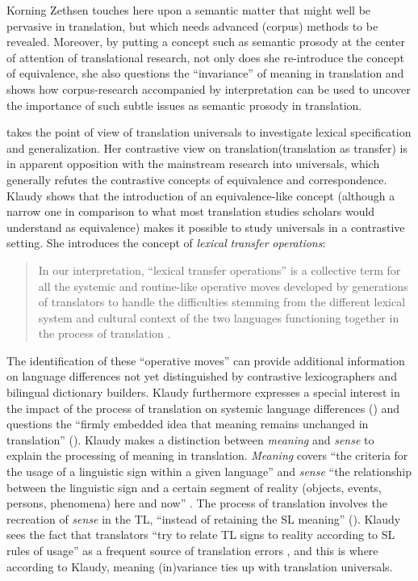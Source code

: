 Korning Zethsen touches here upon a semantic matter that might well be pervasive in translation, but which needs advanced (corpus) methods to be revealed. Moreover, by putting a concept such as semantic prosody at the center of attention of translational research, not only does she re-introduce the concept of equivalence, she also questions the ``invariance'' of meaning in translation and shows how corpus-research accompanied by interpretation can be used to uncover the importance of such subtle issues as semantic prosody in translation.

\citet{lewandowska-tomasczyk_specification_2010} takes the point of view of translation universals to investigate lexical specification and generalization. Her contrastive view on translation\linebreak (translation as transfer) is in apparent opposition with the mainstream research into universals, which generally refutes the contrastive concepts of equivalence and correspondence. Klaudy shows that the introduction of an equivalence-like concept (although a narrow one in comparison to what most translation studies scholars would understand as equivalence) makes it possible to study universals in a contrastive setting. She introduces the concept of \textit{lexical} \textit{transfer} \textit{operations}:

\begin{quote}
In our interpretation, “lexical transfer operations” is a collective term for all the systemic and routine-like operative moves developed by generations of translators to handle the difficulties stemming from the different lexical system and cultural context of the two languages functioning together in the process of translation \citep[81]{lewandowska-tomasczyk_specification_2010}.
\end{quote}

The identification of these “operative moves” can provide additional information on language differences not yet distinguished by contrastive lexicographers and bilingual dictionary builders. Klaudy furthermore expresses a special interest in the impact of the process of translation on systemic language differences (\citeyear[82]{lewandowska-tomasczyk_specification_2010}) and questions the “firmly embedded idea that meaning remains unchanged in translation” (\citeyear[82]{lewandowska-tomasczyk_specification_2010}). Klaudy makes a distinction between \textit{meaning} and \textit{sense} to explain the processing of meaning in translation. \textit{Meaning} covers “the criteria for the usage of a linguistic sign within a given language” and \textit{sense} “the relationship between the linguistic sign and a certain segment of reality (objects, events, persons, phenomena) here and now” \citep[83]{lewandowska-tomasczyk_specification_2010}. The process of translation involves the recreation of \textit{sense} in the TL, “instead of retaining the SL meaning” (\citeyear[83]{lewandowska-tomasczyk_specification_2010}). Klaudy sees the fact that translators “try to relate TL signs to reality according to SL rules of usage” as a frequent source of translation errors \citep[83]{lewandowska-tomasczyk_specification_2010}, and this is where according to Klaudy, meaning (in)variance ties up with translation universals.

